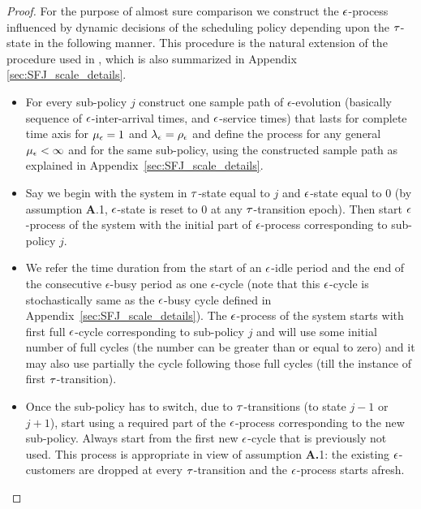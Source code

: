 \begin{proof}
For the purpose of almost sure comparison we construct the
${ \epsilon }$-process influenced by dynamic decisions of the scheduling policy
depending upon the ${\tau}$-state in the following manner. This procedure
is the natural extension of the procedure used in \cite{ANOR}, which is also summarized in Appendix \ref{sec:SFJ_scale_details}.  %


\begin{itemize}
\item For every  sub-policy $j$ construct one sample path of $\epsilon$-evolution (basically sequence of ${ \epsilon }$-inter-arrival times, and ${ \epsilon }$-service times)  that lasts  for complete time axis   for $\mu_{ \epsilon }  = 1$ and $\lambda_{ \epsilon } = \rho_{ \epsilon }$ and 
define the process for any  general $\mu_{ \epsilon } < \infty$   and for the same sub-policy,  using the constructed sample path as explained  in  Appendix~\ref{sec:SFJ_scale_details}. 
	\item Say we begin with the system in ${\tau}$-state equal  to $j$  and ${ \epsilon }$-state equal to 0 (by assumption {\bf A}.1, ${ \epsilon }$-state is reset to 0   at any  ${\tau}$-transition  epoch).  Then start  ${ \epsilon }$-process of the system  with the initial part of ${ \epsilon }$-process corresponding to  sub-policy $j$. %
	
	\item We refer the time duration from the start of an ${ \epsilon }$-idle period
	and the end of the consecutive $\epsilon$-busy period as one
	$\epsilon$-cycle (note that this ${ \epsilon }$-cycle is stochastically same as the ${ \epsilon }$-busy cycle defined in Appendix~\ref{sec:SFJ_scale_details}).  The ${ \epsilon }$-process of the system starts with first full ${ \epsilon }$-cycle corresponding to sub-policy $j$ and will use some initial number of full cycles (the number can be greater than or equal to zero) and  it may also  use partially  the  cycle  following those full cycles (till the instance of first ${\tau}$-transition).  
	
	
	\item  Once the sub-policy has to switch, due to ${\tau}$-transitions (to state $j-1$ or $j+1$), start using a required part of the ${ \epsilon }$-process corresponding to the new sub-policy. Always start from the first new ${ \epsilon }$-cycle that is previously not used. This process is appropriate in view of assumption {\bf A.}1:  the existing ${ \epsilon }$-customers are dropped at every ${\tau}$-transition and the ${ \epsilon }$-process starts afresh.  
	

\end{itemize}
\end{proof}

